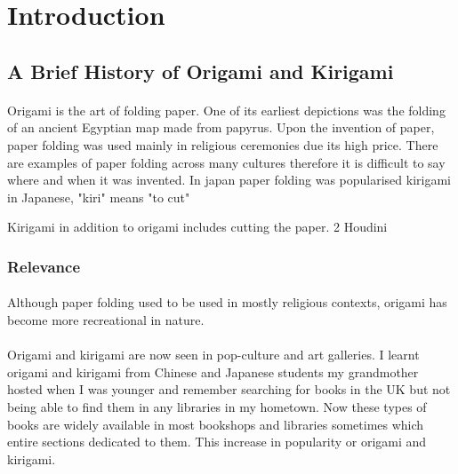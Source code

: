 \documentclass[11pt]{article}
\begin{document}
\newpage
\section{Introduction}

        \subsection{A Brief History of Origami and Kirigami}
        
            \paragraph{}
            Origami is the art of folding paper. One of its earliest depictions was the folding of an ancient Egyptian map made from papyrus. Upon the invention of paper, paper folding was used mainly in religious ceremonies due its high price. There are examples of paper folding across many cultures therefore it is difficult to say where and when it was invented. In japan paper folding was popularised 
            kirigami
            in Japanese, "kiri" means "to cut"
            \cite{Temko2004kirigami}
          
            Kirigami in addition to origami includes cutting the paper. 2 
            Houdini 
    
            \subsubsection{Relevance}
                \paragraph{} 
                Although paper folding used to be used in mostly religious contexts, origami has become more recreational in nature. 
            
                \paragraph{} 
                Origami and kirigami are now seen in pop-culture and art galleries. 
                I learnt origami and kirigami from Chinese and Japanese students my grandmother hosted when I was younger and remember searching for books in the UK but not being able to find them in any libraries in my hometown. Now these types of books are widely available in most bookshops and libraries sometimes which entire sections dedicated to them. This increase in popularity or origami and kirigami.
            
\end{document}

